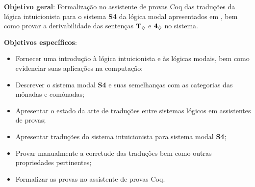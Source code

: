 \textbf{Objetivo geral}: Formalização no assistente de provas Coq das traduções da lógica intuicionista para o sistema \textbf{S4} da lógica modal apresentados em \cite{Troelstra}, bem como provar a derivabilidade das sentenças $\boldsymbol{\text{\textbf{T}}_\Diamond}$ e $\boldsymbol{\text{\textbf{4}}_\Diamond}$ no sistema.

\bigskip

\noindent
\textbf{Objetivos específicos}:
\begin{itemize}
    \item Fornecer uma introdução à lógica intuicionista e às lógicas modais, bem como evidenciar suas aplicações na computação;
    \item Descrever o sistema modal \textbf{S4} e suas semelhanças com as categorias das mônadas e comônadas;
    \item Apresentar o estado da arte de traduções entre sistemas lógicos em assistentes de provas;
    \item Apresentar traduções do sistema intuicionista para sistema modal \textbf{S4};
    \item Provar manualmente a corretude das traduções bem como outras propriedades pertinentes;
    \item Formalizar as provas no assistente de provas Coq.
\end{itemize}